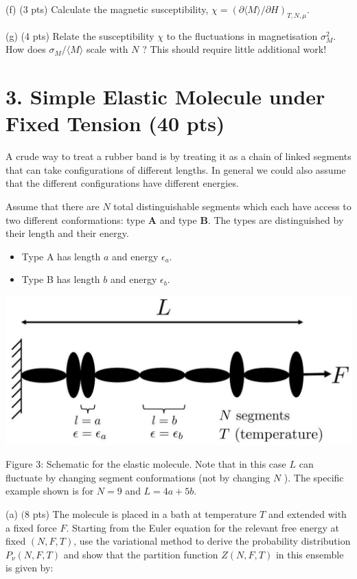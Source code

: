 \documentclass[10pt]{article}
\begin{document}
(f) (3 pts) Calculate the magnetic susceptibility, $\chi=(\partial\langle M\rangle / \partial H)_{T, N, \mu}$.

(g) (4 pts) Relate the susceptibility $\chi$ to the fluctuations in magnetisation $\sigma_{M}^{2}$. How does $\sigma_{M} /\langle M\rangle$ scale with $N$ ? This should require little additional work!

\section*{3. Simple Elastic Molecule under Fixed Tension (40 pts)}
A crude way to treat a rubber band is by treating it as a chain of linked segments that can take configurations of different lengths. In general we could also assume that the different configurations have different energies.

Assume that there are $N$ total distinguishable segments which each have access to two different conformations: type $\mathbf{A}$ and type $\mathbf{B}$. The types are distinguished by their length and their energy.

\begin{itemize}
  \item Type A has length $a$ and energy $\epsilon_{a}$.
  \item Type B has length $b$ and energy $\epsilon_{b}$.
\end{itemize}

\begin{center}
\includegraphics[max width=\textwidth]{2024_02_03_75704bce2caff28cbfb1g-5}
\end{center}

Figure 3: Schematic for the elastic molecule. Note that in this case $L$ can fluctuate by changing segment conformations (not by changing $N$ ). The specific example shown is for $N=9$ and $L=4 a+5 b$.

(a) $(8$ pts) The molecule is placed in a bath at temperature $T$ and extended with a fixed force $F$. Starting from the Euler equation for the relevant free energy at fixed $(N, F, T)$, use the variational method to derive the probability distribution $P_{\nu}(N, F, T)$ and show that the partition function $Z(N, F, T)$ in this ensemble is given by:
\end{document}
